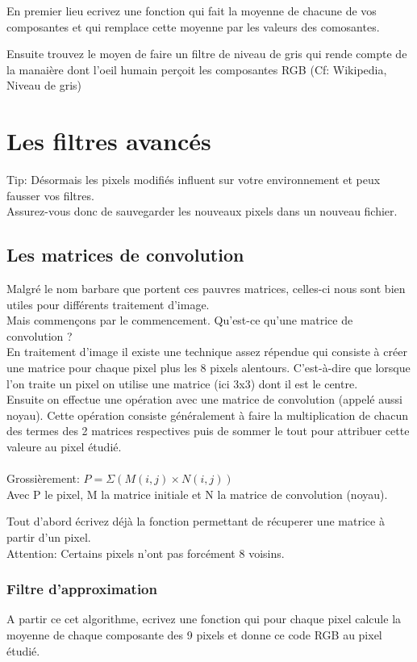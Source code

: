 \documentclass[a4paper]{article}
\begin{document}
En premier lieu ecrivez une fonction qui fait la moyenne de chacune de vos composantes et qui remplace cette moyenne par les valeurs des comosantes.

Ensuite trouvez le moyen de faire un filtre de niveau de gris qui rende compte de la manaière dont l'oeil humain perçoit les composantes RGB (Cf: Wikipedia, Niveau de gris)

\section{Les filtres avancés}
Tip: Désormais les pixels modifiés influent sur votre environnement et peux fausser vos filtres.\\
Assurez-vous donc de sauvegarder les nouveaux pixels dans un nouveau fichier.
\subsection{Les matrices de convolution}
Malgré le nom barbare que portent ces pauvres matrices, celles-ci nous sont bien utiles pour différents traitement d'image.\\
Mais commençons par le commencement. Qu'est-ce qu'une matrice de convolution ?\\
En traitement d'image il existe une technique assez répendue qui consiste à créer une matrice pour chaque pixel plus les 8 pixels alentours.
C'est-à-dire que lorsque l'on traite un pixel on utilise une matrice (ici 3x3) dont il est le centre.\\
Ensuite on effectue une opération avec une matrice de convolution (appelé aussi noyau). Cette opération consiste généralement 
à faire la multiplication de chacun des termes des 2 matrices respectives puis de sommer le tout pour attribuer cette valeure au pixel étudié.\\\\
Grossièrement: 	\begin{math}
		P = \Sigma ( M(i,j) \times  N(i,j) )
		\end{math} \\
Avec P le pixel, M la matrice initiale et N la matrice de convolution (noyau).

Tout d'abord écrivez déjà la fonction permettant de récuperer une matrice à partir d'un pixel.\\
Attention: Certains pixels n'ont pas forcément 8 voisins.

\subsubsection{Filtre d'approximation}
A partir ce cet algorithme, ecrivez une fonction qui pour chaque pixel calcule la moyenne de chaque composante des 9 pixels et donne ce code RGB au pixel étudié.
\end{document}
